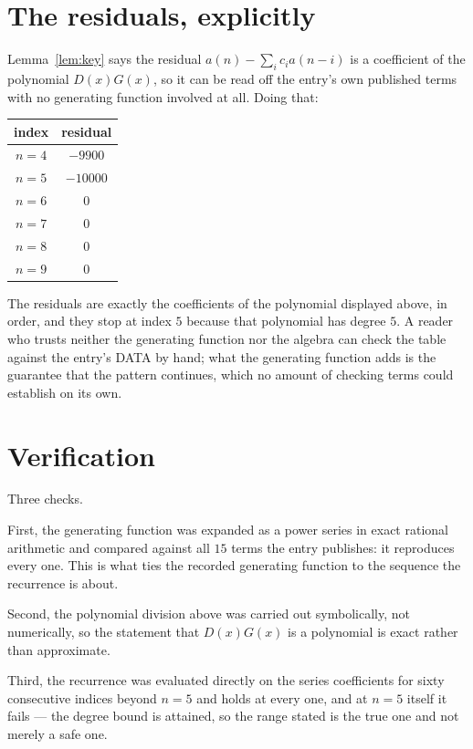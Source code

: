 \documentclass[11pt,a4paper]{article}
\theoremstyle{plain}
\theoremstyle{definition}
\begin{document}
\section{The residuals, explicitly}

Lemma~\ref{lem:key} says the residual $a(n)-\sum_ic_ia(n-i)$ is a coefficient of the
polynomial $D(x)G(x)$, so it can be read off the entry's own published terms with no
generating function involved at all. Doing that:
\begin{center}
\begin{tabular}{cc}
index & residual \\ \hline
$n=4$ & $-9900$ \\
$n=5$ & $-10000$ \\
$n=6$ & $0$ \\
$n=7$ & $0$ \\
$n=8$ & $0$ \\
$n=9$ & $0$
\end{tabular}
\end{center}
The residuals are exactly the coefficients of the polynomial displayed above, in order, and
they stop at index $5$ because that polynomial has degree $5$. A reader who trusts
neither the generating function nor the algebra can check the table against the entry's DATA
by hand; what the generating function adds is the guarantee that the pattern continues, which
no amount of checking terms could establish on its own.

\section{Verification}

Three checks.

First, the generating function was expanded as a power series in exact rational arithmetic and
compared against all $15$ terms the entry publishes: it reproduces every one. This is
what ties the recorded generating function to the sequence the recurrence is about.

Second, the polynomial division above was carried out symbolically, not numerically, so the
statement that $D(x)G(x)$ is a polynomial is exact rather than approximate.

Third, the recurrence was evaluated directly on the series coefficients for sixty consecutive
indices beyond $n=5$ and holds at every one, and at $n=5$ itself it fails --- the
degree bound is attained, so the range stated is the true one and not merely a safe one.
\end{document}
